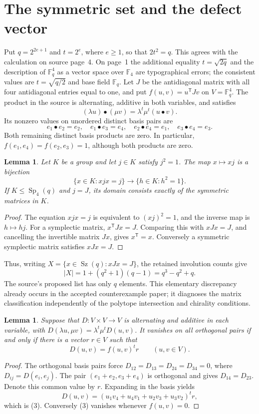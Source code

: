 \documentclass[11pt,a4paper]{article}
\newtheorem{lemma}[theorem]{Lemma}
\newcommand{\Sz}{\operatorname{Sz}}
\newcommand{\Sp}{\operatorname{Sp}}
\newcommand{\F}{\mathbb F}
\begin{document}
\section{The symmetric set and the defect vector}
Put $q=2^{2e+1}$ and $t=2^e$, where $e\geq1$, so that $2t^2=q$.
This agrees with the calculation on source page~4. On page~1 the
additional equality $t=\sqrt{2q}$ and the description of $\F_q^4$
as a vector space over $\F_4$ are typographical errors; the consistent
values are $t=\sqrt{q/2}$ and base field $\F_q$.
Let $J$ be the antidiagonal matrix with all four antidiagonal entries
equal to one, and put $f(u,v)=u^{\mathsf T}Jv$ on $V=\F_q^4$.
The product in the source is alternating, additive in both variables,
and satisfies
\[
 (\lambda u)\mathbin\bullet(\mu v)
   =\lambda^t\mu^t(u\mathbin\bullet v).
\]
Its nonzero values on unordered distinct basis pairs are
\[
 e_1\bullet e_2=e_2,\quad e_1\bullet e_3=e_4,
 \quad e_2\bullet e_4=e_1,\quad e_3\bullet e_4=e_3.
 \tag{1}
\]
Both remaining distinct basis products are zero. In particular,
$f(e_1,e_4)=f(e_2,e_3)=1$, although both products are zero.

\begin{lemma}\label{translate}
Let $K$ be a group and let $j\in K$ satisfy $j^2=1$. The map $x\mapsto xj$ is a
bijection
\[
 \{x\in K:xjx=j\}\longrightarrow\{h\in K:h^2=1\}.
\]
If $K\leq\Sp_4(q)$ and $j=J$, its domain consists exactly of the
symmetric matrices in $K$.
\end{lemma}
\begin{proof}
The equation $xjx=j$ is equivalent to $(xj)^2=1$, and the inverse
map is $h\mapsto hj$. For a symplectic matrix,
$x^{\mathsf T}Jx=J$. Comparing this with $xJx=J$, and cancelling
the invertible matrix $Jx$, gives $x^{\mathsf T}=x$. Conversely a
symmetric symplectic matrix satisfies $xJx=J$.
\end{proof}

Thus, writing $X=\{x\in\Sz(q):xJx=J\}$, the retained involution
counts give
\[
 |X|=1+(q^2+1)(q-1)=q^3-q^2+q.
 \tag{2}
\]
The source's proposed list has only $q$ elements. This elementary
discrepancy already occurs in the accepted counterexample paper;
it diagnoses the matrix classification independently of the polytope
intersection and chirality conditions.

\begin{lemma}\label{defect}
Suppose that $D:V\times V\to V$ is alternating and additive in
each variable, with
$D(\lambda u,\mu v)=\lambda^t\mu^tD(u,v)$.
It vanishes on all orthogonal pairs if and only if there is a vector
$r\in V$ such that
\[
 D(u,v)=f(u,v)^t r\qquad(u,v\in V).
 \tag{3}
\]
\end{lemma}
\begin{proof}
The orthogonal basis pairs force $D_{12}=D_{13}=D_{24}=D_{34}=0$,
where $D_{ij}=D(e_i,e_j)$. The pair
$(e_1+e_2,e_3+e_4)$ is orthogonal and gives $D_{14}=D_{23}$.
Denote this common value by $r$. Expanding in the basis yields
\[
 D(u,v)=(u_1v_4+u_4v_1+u_2v_3+u_3v_2)^t r,
\]
which is (3). Conversely (3) vanishes whenever $f(u,v)=0$.
\end{proof}
\end{document}
